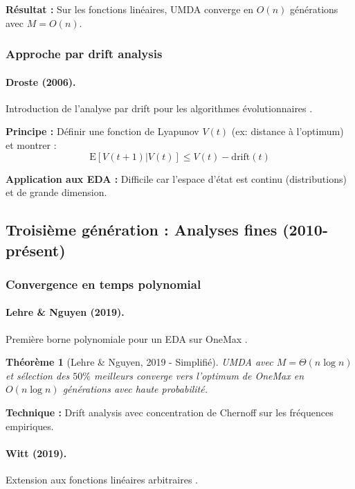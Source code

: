 \documentclass[12pt,a4paper]{article}
\newtheorem{theorem}{Théorème}[section]
\theoremstyle{definition}
\theoremstyle{remark}
\newcommand{\E}{\text{E}}
\begin{document}
\textbf{Résultat :} Sur les fonctions linéaires, UMDA converge en $O(n)$ générations avec $M = O(n)$.

\subsubsection{Approche par drift analysis}

\paragraph{Droste (2006).}
Introduction de l'analyse par drift pour les algorithmes évolutionnaires \cite{droste2006analysis}.

\textbf{Principe :} Définir une fonction de Lyapunov $V(t)$ (ex: distance à l'optimum) et montrer :
$$\E[V(t+1) | V(t)] \leq V(t) - \text{drift}(t)$$

\textbf{Application aux EDA :} Difficile car l'espace d'état est continu (distributions) et de grande dimension.

\subsection{Troisième génération : Analyses fines (2010-présent)}

\subsubsection{Convergence en temps polynomial}

\paragraph{Lehre \& Nguyen (2019).}
Première borne polynomiale pour un EDA sur OneMax \cite{lehre2019runtime}.

\begin{theorem}[Lehre \& Nguyen, 2019 - Simplifié]
UMDA avec $M = \Theta(n \log n)$ et sélection des $50\%$ meilleurs converge vers l'optimum de OneMax en $O(n \log n)$ générations avec haute probabilité.
\end{theorem}

\textbf{Technique :} Drift analysis avec concentration de Chernoff sur les fréquences empiriques.

\paragraph{Witt (2019).}
Extension aux fonctions linéaires arbitraires \cite{witt2019runtime}.
\end{document}
